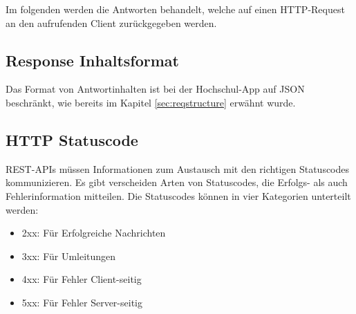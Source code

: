 Im folgenden werden die Antworten behandelt, welche auf einen \ac{HTTP}-Request an den aufrufenden Client zurückgegeben werden. 

\subsection{Response Inhaltsformat}

Das Format von Antwortinhalten ist bei der Hochschul-\ac{App} auf \ac{JSON} beschränkt, wie bereits im Kapitel \ref{sec:reqstructure} erwähnt wurde. 

\subsection{HTTP Statuscode}

\ac{REST}-\acp{API} müssen Informationen zum Austausch mit den richtigen Statuscodes kommunizieren. Es gibt verscheiden Arten von Statuscodes, die Erfolgs- als auch Fehlerinformation mitteilen. Die Statuscodes können in vier Kategorien unterteilt werden:

\begin{itemize}
\item 2xx: Für Erfolgreiche Nachrichten
\item 3xx: Für Umleitungen
\item 4xx: Für Fehler Client-seitig
\item 5xx: Für Fehler Server-seitig
\end{itemize}

